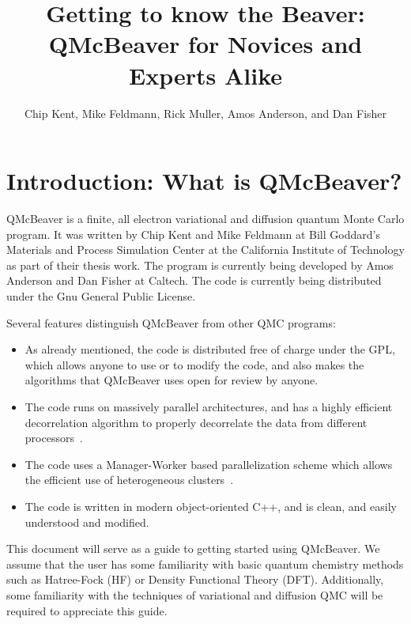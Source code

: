 \documentclass[11pt]{article}
\begin{document}
\title{Getting to know the Beaver:\\ QMcBeaver for Novices and Experts
  Alike}
\author{Chip Kent, Mike Feldmann, Rick Muller, Amos Anderson, and Dan Fisher}
\maketitle

\newcommand{\NN}{\mbox{$\mathbb N$}}
\newcommand{\RR}{\mbox{$\mathbb R$}}

\section{Introduction: What is QMcBeaver?}
QMcBeaver is a finite, all electron variational and diffusion quantum
Monte Carlo program.  It was written by Chip Kent and Mike Feldmann at
Bill Goddard's Materials and Process Simulation Center at the
California Institute of Technology as part of their thesis work. The
program is currently being developed by Amos Anderson and Dan Fisher
at Caltech. The code is currently
being distributed under the Gnu General Public License.

Several features distinguish QMcBeaver from other QMC programs:
\begin{itemize}
\item As already mentioned, the code is distributed free of charge
  under the GPL, which allows anyone to use or to modify the code, and
  also makes the algorithms that QMcBeaver uses open for review by
  anyone.
\item The code runs on massively parallel architectures, and has a
  highly efficient decorrelation algorithm to properly decorrelate the
  data from different processors~\cite{DDDA}.
\item The code uses a Manager-Worker based parallelization scheme
  which allows the efficient use of heterogeneous clusters~\cite{QMC-MW}.
\item The code is written in modern object-oriented C++, and is clean,
  and easily understood and modified.


\end{itemize}

This document will serve as a guide to getting started using
QMcBeaver. We assume that the user has some familiarity with basic
quantum chemistry methods such as Hatree-Fock (HF) or Density
Functional Theory (DFT). Additionally, some familiarity with the
techniques of variational and diffusion QMC will be required to
appreciate this guide.
\end{document}
